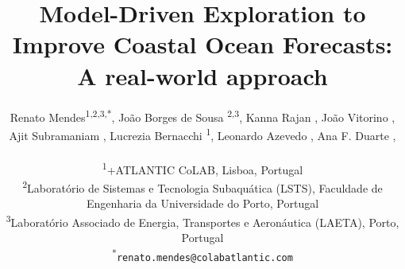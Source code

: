 \documentclass[11pt]{article}
\title{Model-Driven Exploration to Improve Coastal Ocean Forecasts: A real-world approach}
\author{
Renato Mendes\textsuperscript{1,2,3,*},
João Borges de Sousa \textsuperscript{2,3},
Kanna Rajan \textsuperscript{},
João Vitorino \textsuperscript{},\\
Ajit Subramaniam \textsuperscript{},
Lucrezia Bernacchi \textsuperscript{1},
Leonardo Azevedo \textsuperscript{},
Ana F. Duarte \textsuperscript{},
\\
\\
\textsuperscript{1}{\scriptsize +ATLANTIC CoLAB, Lisboa, Portugal}\\
\textsuperscript{2}{\scriptsize Laboratório de Sistemas e Tecnologia Subaquática (LSTS), Faculdade de Engenharia da Universidade do Porto, Portugal}\\
\textsuperscript{3}{\scriptsize Laboratório Associado de Energia, Transportes e Aeronáutica (LAETA), Porto, Portugal}\\
\textsuperscript{*}\texttt{{\scriptsize renato.mendes@colabatlantic.com}}
}
\date{}
\begin{document}

\maketitle

%





\footnotesize{
  
}
\end{document}
